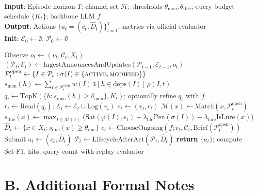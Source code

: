 \begin{algorithm}[h]
\caption{ProMem on a PM-Bench episode}
\label{alg:promem}
\textbf{Input}: Episode horizon $T$; channel set $\mathcal{H}$; thresholds $\theta_{\mathrm{mon}},\theta_{\mathrm{due}}$; query budget schedule $\{K_t\}$; backbone LLM $f$\\
\textbf{Output}: Actions $\{a_t=(c_t,\hat{D}_t)\}_{t=1}^{T}$; metrics via official evaluator\\
\textbf{Init}: $\mathcal{E}_0\leftarrow\emptyset$, $\mathcal{P}_0\leftarrow\emptyset$
\begin{algorithmic}[1]
\STATE Observe $o_t\leftarrow(v_t,\mathcal{C}_t,X_t)$ 
\STATE $(\mathcal{P}_t,\mathcal{E}_t)\leftarrow\mathrm{IngestAnnouncesAndUpdates}(\mathcal{P}_{t-1},\mathcal{E}_{t-1},o_t)$ 
\STATE {}
\STATE $\mathcal{P}_t^{\mathrm{open}}\leftarrow\{I\in\mathcal{P}_t:\sigma(I)\in\{\textsc{active},\textsc{modified}\}\}$
\STATE $s_{\mathrm{mon}}(h)\leftarrow\sum_{I\in\mathcal{P}_t^{\mathrm{open}}} w(I)\,\mathbb{1}[h\in\mathrm{deps}(I)]\,\rho(I,t)$
\ENDFOR
\STATE $q_t\leftarrow\mathrm{TopK}(\{h:s_{\mathrm{mon}}(h)\ge\theta_{\mathrm{mon}}\},K_t)$; optionally refine $q_t$ with $f$
\STATE $r_t\leftarrow\mathrm{Read}(q_t)$; $\mathcal{E}_t\leftarrow\mathcal{E}_t\cup\mathrm{Log}(r_t)$
\STATE $e_t\leftarrow(v_t,r_t)$
\STATE $\mathcal{M}(x)\leftarrow\mathrm{Match}(x,\mathcal{P}_t^{\mathrm{open}})$
\STATE $s_{\mathrm{due}}(x)\leftarrow\max_{I\in\mathcal{M}(x)}\big(\mathrm{Sat}(\varphi(I),e_t)-\lambda_{\mathrm{life}}\mathrm{Pen}(\sigma(I))-\lambda_{\mathrm{lure}}\mathrm{IsLure}(x)\big)$
\STATE {}
\ENDFOR
\STATE $\hat{D}_t\leftarrow\{x\in X_t:s_{\mathrm{due}}(x)\ge\theta_{\mathrm{due}}\}$
\STATE $c_t\leftarrow\mathrm{ChooseOngoing}(f;v_t,\mathcal{C}_t,\mathrm{Brief}(\mathcal{P}_t^{\mathrm{open}}))$
\STATE Submit $a_t\leftarrow(c_t,\hat{D}_t)$
\STATE $\mathcal{P}_t\leftarrow\mathrm{LifecycleAfterAct}(\mathcal{P}_t,\hat{D}_t)$ 
\ENDFOR
\STATE \textbf{return} $\{a_t\}$; compute Set-F1, hits, query count with replay evaluator
\end{algorithmic}
\end{algorithm}

\section{B. Additional Formal Notes}
\label{sec:formal-notes}

